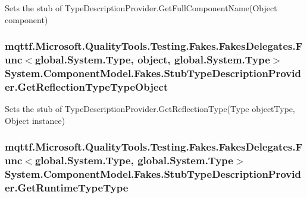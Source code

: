 Sets the stub of Type\-Description\-Provider.\-Get\-Full\-Component\-Name(\-Object component)

\hypertarget{class_system_1_1_component_model_1_1_fakes_1_1_stub_type_description_provider_a9eeedc3f7128ee146abeda81f62dc8dc}{
\subsubsection[{Get\-Reflection\-Type\-Type\-Object}]{\setlength{\rightskip}{0pt plus 5cm}mqttf.\-Microsoft.\-Quality\-Tools.\-Testing.\-Fakes.\-Fakes\-Delegates.\-Func$<$global.\-System.\-Type, object, global.\-System.\-Type$>$ System.\-Component\-Model.\-Fakes.\-Stub\-Type\-Description\-Provider.\-Get\-Reflection\-Type\-Type\-Object}}\label{class_system_1_1_component_model_1_1_fakes_1_1_stub_type_description_provider_a9eeedc3f7128ee146abeda81f62dc8dc}


Sets the stub of Type\-Description\-Provider.\-Get\-Reflection\-Type(\-Type object\-Type, Object instance)

\hypertarget{class_system_1_1_component_model_1_1_fakes_1_1_stub_type_description_provider_a3cb558ac64fc3fa289a3f76fc37fea19}{
\subsubsection[{Get\-Runtime\-Type\-Type}]{\setlength{\rightskip}{0pt plus 5cm}mqttf.\-Microsoft.\-Quality\-Tools.\-Testing.\-Fakes.\-Fakes\-Delegates.\-Func$<$global.\-System.\-Type, global.\-System.\-Type$>$ System.\-Component\-Model.\-Fakes.\-Stub\-Type\-Description\-Provider.\-Get\-Runtime\-Type\-Type}}\label{class_system_1_1_component_model_1_1_fakes_1_1_stub_type_description_provider_a3cb558ac64fc3fa289a3f76fc37fea19}


